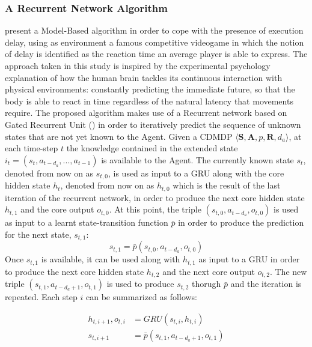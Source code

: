             \subsubsection{A Recurrent Network Algorithm}
                \label{subsub:modelbased_recurrent}            
                 present a Model-Based algorithm in order to cope with the presence of execution delay, using as environment a famous competitive videogame in which the notion of delay is identified as the reaction time an average player is able to express. The approach taken in this study is inspired by the experimental psychology explanation of how the human brain tackles its continuous interaction with physical environments: constantly predicting the immediate future, so that the body is able to react in time regardless of the natural latency that movements require. \newline
                The proposed algorithm makes use of a Recurrent network based on Gated Recurrent Unit () in order to iteratively predict the sequence of unknown states that are not yet known to the Agent. Given a CDMDP $\langle \mathbf{S}, \mathbf{A}, p, \mathbf{R}, d_a\rangle$, at each time-step $t$ the knowledge contained in the extended state $i_t = \left( s_{t}, a_{t-d_a},..., a_{t-1}\right)$ is available to the Agent. The currently known state $s_t$, denoted from now on as $s_{t, 0}$, is used as input to a GRU along with the core hidden state $h_t$, denoted from now on as $h_{t, 0}$ which is the result of the last iteration of the recurrent network, in order to produce the next core hidden state $h_{t, 1}$ and the core output $o_{t, 0}$. At this point, the triple $(s_{t, 0}, a_{t-d_a}, o_{t, 0})$ is used as input to a learnt state-transition function $\bar{p}$ in order to produce the prediction for the next state, $s_{t, 1}$:
                \[ s_{t, 1} = \bar{p}(s_{t, 0}, a_{t-d_a}, o_{t, 0}) \]
                Once $s_{t, 1}$ is available, it can be used along with $h_{t, 1}$ as input to a GRU in order to produce the next core hidden state $h_{t, 2}$ and the next core output $o_{t, 2}$. The new triple $(s_{t, 1}, a_{t-d_a+1}, o_{t, 1})$ is used to produce $s_{t, 2}$ thorugh $\bar{p}$ and the iteration is repeated. Each step $i$ can be summarized as follows:
                
                \begin{align*}
                    h_{t, i+1}, o_{t, i} &= GRU(s_{t, i}, h_{t, i})\\
                    s_{t, i+1} &= \bar{p}(s_{t, 1}, a_{t-d_a+1}, o_{t, 1})
                \end{align*}
                
